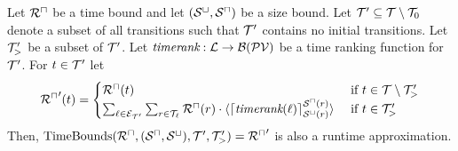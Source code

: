 \begin{theorem}
  Let ${\mathcal{R}^\sqcap}$ be a time bound and let ${({\mathcal{S}^\sqcup}, {\mathcal{S}^\sqcap})}$ be a size bound.
  Let $\mathcal{T}' \subseteq \mathcal{T} \setminus \mathcal{T}_0$ denote a subset of all transitions such that $\mathcal{T}'$ contains no initial transitions.
  Let $\mathcal{T}'_>$ be a subset of $\mathcal{T}'$.
  Let $\emph{timerank}: \mathcal{L} \rightarrow \mathcal{B}(\mathcal{PV})$ be a time ranking function for $\mathcal{T}'$.
  For $t \in \mathcal{T}'$ let
  \[ {\mathcal{R}^\sqcap}'(t) = 
  \begin{cases}
    {\mathcal{R}^\sqcap}(t) & \text{ if } t \in \mathcal{T} \setminus \mathcal{T}'_> \\
    \sum_{\ell \in \mathcal{E}_{\mathcal{T}'}} \sum_{r \in \mathcal{T}_\ell} {\mathcal{R}^\sqcap}(r) \cdot \langle\lceil \emph{timerank}(\ell) \rceil^{{\mathcal{S}^\sqcap}(r)}_{{\mathcal{S}^\sqcup}(r)}\rangle & \text{ if } t \in \mathcal{T}'_>
  \end{cases}
  \]
  Then, $\text{TimeBounds}({\mathcal{R}^\sqcap}, ({\mathcal{S}^\sqcap}, {\mathcal{S}^\sqcup}), \mathcal{T}', \mathcal{T}'_>) = {\mathcal{R}^\sqcap}'$ is also a runtime approximation.
\end{theorem}
